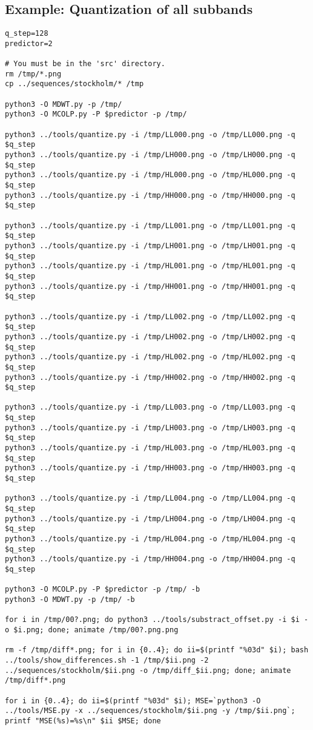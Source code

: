 \subsection*{Example: Quantization of all subbands}
\begin{verbatim}
q_step=128
predictor=2

# You must be in the 'src' directory.
rm /tmp/*.png
cp ../sequences/stockholm/* /tmp

python3 -O MDWT.py -p /tmp/
python3 -O MCOLP.py -P $predictor -p /tmp/

python3 ../tools/quantize.py -i /tmp/LL000.png -o /tmp/LL000.png -q $q_step
python3 ../tools/quantize.py -i /tmp/LH000.png -o /tmp/LH000.png -q $q_step
python3 ../tools/quantize.py -i /tmp/HL000.png -o /tmp/HL000.png -q $q_step
python3 ../tools/quantize.py -i /tmp/HH000.png -o /tmp/HH000.png -q $q_step

python3 ../tools/quantize.py -i /tmp/LL001.png -o /tmp/LL001.png -q $q_step
python3 ../tools/quantize.py -i /tmp/LH001.png -o /tmp/LH001.png -q $q_step
python3 ../tools/quantize.py -i /tmp/HL001.png -o /tmp/HL001.png -q $q_step
python3 ../tools/quantize.py -i /tmp/HH001.png -o /tmp/HH001.png -q $q_step

python3 ../tools/quantize.py -i /tmp/LL002.png -o /tmp/LL002.png -q $q_step
python3 ../tools/quantize.py -i /tmp/LH002.png -o /tmp/LH002.png -q $q_step
python3 ../tools/quantize.py -i /tmp/HL002.png -o /tmp/HL002.png -q $q_step
python3 ../tools/quantize.py -i /tmp/HH002.png -o /tmp/HH002.png -q $q_step

python3 ../tools/quantize.py -i /tmp/LL003.png -o /tmp/LL003.png -q $q_step
python3 ../tools/quantize.py -i /tmp/LH003.png -o /tmp/LH003.png -q $q_step
python3 ../tools/quantize.py -i /tmp/HL003.png -o /tmp/HL003.png -q $q_step
python3 ../tools/quantize.py -i /tmp/HH003.png -o /tmp/HH003.png -q $q_step

python3 ../tools/quantize.py -i /tmp/LL004.png -o /tmp/LL004.png -q $q_step
python3 ../tools/quantize.py -i /tmp/LH004.png -o /tmp/LH004.png -q $q_step
python3 ../tools/quantize.py -i /tmp/HL004.png -o /tmp/HL004.png -q $q_step
python3 ../tools/quantize.py -i /tmp/HH004.png -o /tmp/HH004.png -q $q_step

python3 -O MCOLP.py -P $predictor -p /tmp/ -b
python3 -O MDWT.py -p /tmp/ -b 

for i in /tmp/00?.png; do python3 ../tools/substract_offset.py -i $i -o $i.png; done; animate /tmp/00?.png.png

rm -f /tmp/diff*.png; for i in {0..4}; do ii=$(printf "%03d" $i); bash ../tools/show_differences.sh -1 /tmp/$ii.png -2 ../sequences/stockholm/$ii.png -o /tmp/diff_$ii.png; done; animate /tmp/diff*.png

for i in {0..4}; do ii=$(printf "%03d" $i); MSE=`python3 -O ../tools/MSE.py -x ../sequences/stockholm/$ii.png -y /tmp/$ii.png`; printf "MSE(%s)=%s\n" $ii $MSE; done
\end{verbatim}

